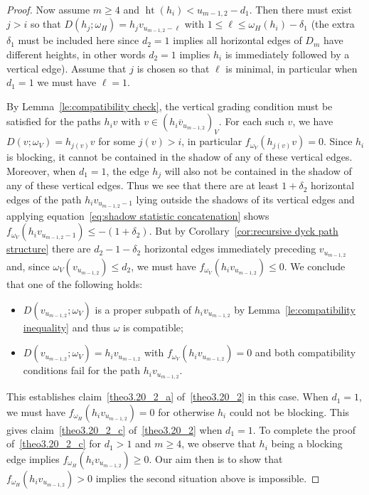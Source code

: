 \documentclass[10pt]{amsart}
\theoremstyle{definition}
\DeclareMathOperator{\hgt}{ht}
\begin{document}
\begin{proof}
 Now assume $m\ge4$ and $\hgt(h_i)<u_{m-1,2}-d_1$. Then there must exist $j>i$ so that $D(h_j;\omega_H)=h_jv_{u_{m-1,2}-\ell}$ with $1\le\ell\le\omega_H(h_i)-\delta_1$
 (the extra $\delta_1$ must be included here since $d_2=1$ implies all horizontal edges of $D_m$ have different heights, in other words $d_2=1$ implies $h_i$ is immediately followed by a vertical edge). 
 Assume that $j$ is chosen so that $\ell$ is minimal, in particular when $d_1=1$ we must have $\ell=1$.

 By Lemma~\ref{le:compatibility check}, the vertical grading condition must be satisfied for the paths $h_iv$ with $v\in(h_i\overline{v}_{u_{m-1,2}})_V$.
 For each such $v$, we have $D(v;\omega_V)=h_{j(v)}v$ for some $j(v)>i$, in particular $f_{\omega_V}(h_{j(v)}v)=0$. 
 Since $h_i$ is blocking, it cannot be contained in the shadow of any of these vertical edges.
 Moreover, when $d_1=1$, the edge $h_j$ will also not be contained in the shadow of any of these vertical edges. 
 Thus we see that there are at least $1+\delta_2$ horizontal edges of the path $h_iv_{u_{m-1,2}-1}$ lying outside the shadows of its vertical edges and applying equation~\eqref{eq:shadow statistic concatenation} shows $f_{\omega_V}(h_iv_{u_{m-1,2}-1})\le-(1+\delta_2)$.
 But by Corollary~\ref{cor:recursive dyck path structure} there are $d_2-1-\delta_2$ horizontal edges immediately preceding $v_{u_{m-1,2}}$ and, since $\omega_V(v_{u_{m-1,2}})\le d_2$, we must have $f_{\omega_V}(h_iv_{u_{m-1,2}})\le0$. 
 We conclude that one of the following holds:
 \begin{itemize}
 \item $D(v_{u_{m-1,2}};\omega_V)$ is a proper subpath of $h_iv_{u_{m-1,2}}$ by Lemma~\ref{le:compatibility inequality} and thus $\omega$ is compatible;
 \item $D(v_{u_{m-1,2}};\omega_V)=h_iv_{u_{m-1,2}}$ with $f_{\omega_V}(h_iv_{u_{m-1,2}})=0$ and both compatibility conditions fail for the path $h_iv_{u_{m-1,2}}$.
 \end{itemize}
 This establishes claim~\ref{theo3.20_2_a} of~\ref{theo3.20_2} in this case. 
 When $d_1=1$, we must have $f_{\omega_H}(h_iv_{u_{m-1,2}})=0$ for otherwise $h_i$ could not be blocking.
 This gives claim~\ref{theo3.20_2_c} of~\ref{theo3.20_2} when $d_1=1$. 
 To complete the proof of~\ref{theo3.20_2_c} for $d_1>1$ and $m\ge4$, we observe that $h_i$ being a blocking edge implies $f_{\omega_H}(h_iv_{u_{m-1,2}})\ge0$.
 Our aim then is to show that $f_{\omega_H}(h_iv_{u_{m-1,2}})>0$ implies the second situation above is impossible.


\end{proof}
\end{document}
